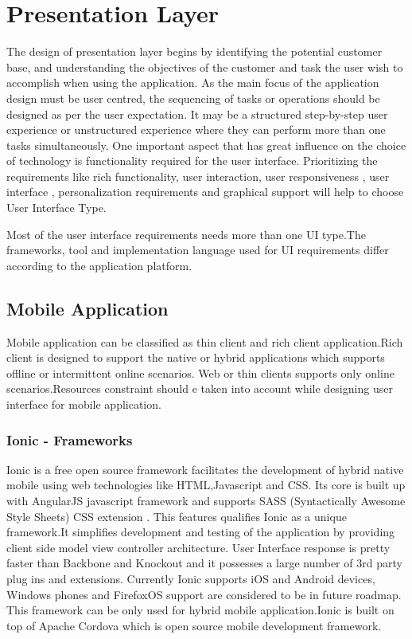 \chapter{Presentation Layer}\label{ch:ch3label}

			The design of presentation layer begins by identifying the potential customer base, and understanding the objectives of the customer and task the user wish to accomplish when using the application. As the main focus of the application design must be user centred, the sequencing of tasks or operations should be designed as per the user expectation. It may be a structured step-by-step user experience or unstructured experience where they can perform more than one tasks simultaneously. One important aspect that has great influence on the choice of technology is functionality required for the user interface. Prioritizing the requirements like rich functionality, user interaction, user responsiveness , user interface , personalization requirements and graphical support will help to choose User Interface Type.
			
			Most of the user interface requirements needs more than one UI type.The frameworks, tool and implementation language used for UI requirements differ according  to the application platform.
			
\section{Mobile Application}
         
            	Mobile application can be classified as thin client and rich client application.Rich client is designed to support the native or hybrid applications which supports offline or intermittent online scenarios. Web or thin clients supports only online  scenarios.Resources constraint should e taken into account while designing user interface for mobile application.
            	
\subsection{Ionic - Frameworks}		
              
              Ionic is a free open source framework facilitates the development of hybrid native mobile using web technologies like HTML,Javascript and CSS. Its core is built up with AngularJS javascript framework and supports SASS (Syntactically Awesome Style Sheets) CSS extension . This features qualifies Ionic as a unique framework.It simplifies development and testing of the application by providing client side model view controller architecture. User Interface response is pretty faster than Backbone and Knockout and it possesses a large number of 3rd party plug ins and extensions. Currently Ionic supports iOS and Android devices, Windows phones and FirefoxOS support are considered to be in future roadmap. This framework can be only used for hybrid mobile application.Ionic is built on top of Apache Cordova which is open source mobile development framework.
              
